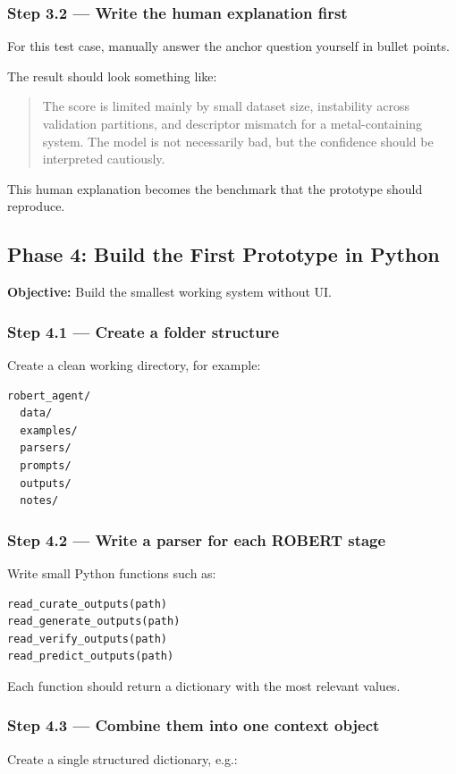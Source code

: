 \documentclass[11pt]{article}
\begin{document}
\subsubsection*{Step 3.2 --- Write the human explanation first}
For this test case, manually answer the anchor question yourself in bullet points.

The result should look something like:

\begin{quote}
The score is limited mainly by small dataset size, instability across validation partitions, and descriptor mismatch for a metal-containing system. The model is not necessarily bad, but the confidence should be interpreted cautiously.
\end{quote}

This human explanation becomes the benchmark that the prototype should reproduce.

\subsection{Phase 4: Build the First Prototype in Python}
\textbf{Objective:} Build the smallest working system without UI.

\subsubsection*{Step 4.1 --- Create a folder structure}
Create a clean working directory, for example:

\begin{verbatim}
robert_agent/
  data/
  examples/
  parsers/
  prompts/
  outputs/
  notes/
\end{verbatim}

\subsubsection*{Step 4.2 --- Write a parser for each ROBERT stage}
Write small Python functions such as:

\begin{verbatim}
read_curate_outputs(path)
read_generate_outputs(path)
read_verify_outputs(path)
read_predict_outputs(path)
\end{verbatim}

Each function should return a dictionary with the most relevant values.

\subsubsection*{Step 4.3 --- Combine them into one context object}
Create a single structured dictionary, e.g.:
\end{document}
